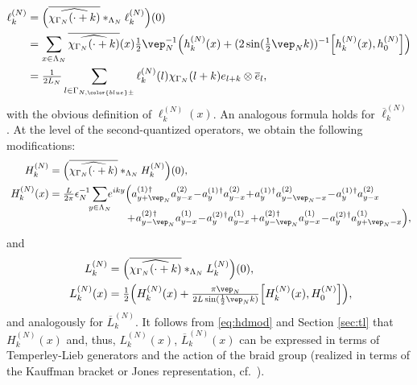 \documentclass[a4paper, 11pt]{article}
\DeclareMathOperator{\1}{\mathds{1}}
\begin{document}
\begin{align}
\label{eq:KSmod1p}
\ell^{(N)}_{k} & = \Big(\overline{\widehat{\chi_{\Gamma_{N}}(\cdot+k)}}\ast_{\Lambda_{N}}\ell^{(N)}_{k}\Big)(0) \\ \nonumber
& = \sum_{x\in\Lambda_{N}}\overline{\widehat{\chi_{\Gamma_{N}}(\cdot+k)}}(x)\tfrac{1}{2}\vep_{N}^{-1}\Big(h_{k}^{(N)}(x)+(2\sin(\tfrac{1}{2}\vep_{N}k))^{-1}\Big[h_{k}^{(N)}(x),h^{(N)}_{0}\Big]\Big) \\ \nonumber
& = \tfrac{1}{2L_{N}}\sum_{l\in\Gamma_{N,{\color{blue}\pm}}}\ell^{(N)}_{k}(l)\chi_{\Gamma_{N}}(l+k)e_{l+k}\otimes \overline{e}_{l},
\end{align}
with the obvious definition of $\ell^{(N)}_{k}(x)$. An analogous formula holds for $\overline{\ell}^{(N)}_{k}$. At the level of the second-quantized operators, we obtain the following modifications:
\begin{align}
\label{eq:hdmod}
H^{(N)}_{k} & = \Big(\overline{\widehat{\chi_{\Gamma_{N}}(\cdot+k)}}\ast_{\Lambda_{N}}H^{(N)}_{k}\Big)(0), \\ \nonumber
H^{(N)}_{k}(x) & = \tfrac{L}{2\pi}\epsilon_{N}^{-1}\!\!\sum_{y\in\Lambda_{N}}\!\!\!e^{iky}\Big(a^{(1)\!\!\ \dagger}_{y+\vep_{N}}a^{(2)}_{y-x}\!-\!a^{(1)\!\!\ \dagger}_{y}a^{(2)}_{y-x}\!+\!a^{(1)\!\!\ \dagger}_{y}a^{(2)}_{y-\vep_{N}-x}\!-\!a^{(1)\!\!\ \dagger}_{y}a^{(2)}_{y-x} \\[-0.25cm] \nonumber
 & \hspace{2.6cm} \!+\!a^{(2)\!\!\ \dagger}_{y-\vep_{N}}a^{(1)}_{y-x}\!-\!a^{(2)\!\!\ \dagger}_{y}a^{(1)}_{y-x}\!+\!a^{(2)\!\!\ \dagger}_{y-\vep_{N}}a^{(1)}_{y-x}\!-\!a^{(2)\!\!\ \dagger}_{y}a^{(1)}_{y+\vep_{N}-x}\Big),
\end{align}
and
\begin{align}
\label{eq:KSmod}
L^{(N)}_{k} & = \Big(\overline{\widehat{\chi_{\Gamma_{N}}(\cdot+k)}}\ast_{\Lambda_{N}}L^{(N)}_{k}\Big)(0), \\ \nonumber
L^{(N)}_{k}(x) & = \tfrac{1}{2}\Big(H_{k}^{(N)}(x)+\tfrac{\pi\vep_{N}}{2L\sin(\frac{1}{2}\vep_{N}k)}\Big[H_{k}^{(N)}(x),H_0^{(N)}\Big]\Big),
\end{align}
and analogously for $\overline{L}^{(N)}_{k}$. It follows from \eqref{eq:hdmod} and Section \ref{sec:tl} that $H^{(N)}_{k}(x)$ and, thus, $L^{(N)}_{k}(x)$, $\overline{L}^{(N)}_{k}(x)$ can be expressed in terms of Temperley-Lieb generators and the action of the braid group (realized in terms of the Kauffman bracket or Jones representation, cf.~\cite{SchuetzDualityTwistedBoundary, StottmeisterAnyonBraidingAnd}).\\
\end{document}
